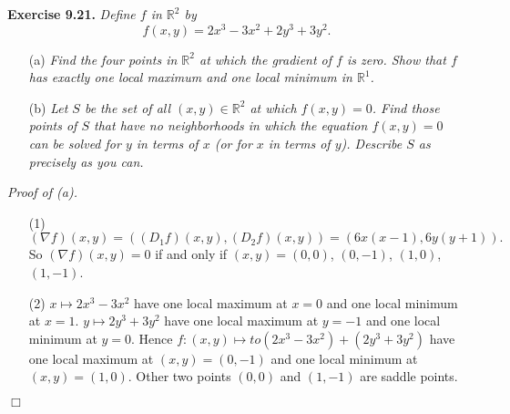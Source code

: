 \documentclass{article}
\begin{document}
\textbf{Exercise 9.21.}
\emph{Define $f$ in $\mathbb{R}^2$ by}
\[
  f(x,y) = 2x^3-3x^2+2y^3+3y^2.
\]
\begin{enumerate}
\item[(a)]
  \emph{Find the four points in $\mathbb{R}^2$ at which the gradient of $f$ is zero.
  Show that $f$ has exactly one local maximum and one local minimum in $\mathbb{R}^1$.}

\item[(b)]
  \emph{Let $S$ be the set of all $(x,y) \in \mathbb{R}^2$ at which $f(x,y) = 0$.
  Find those points of $S$ that have no neighborhoods in which the equation
  $f(x,y) = 0$ can be solved for $y$ in terms of $x$ (or for $x$ in terms of $y$).
  Describe $S$ as precisely as you can.} \\
\end{enumerate}



\emph{Proof of (a).}
\begin{enumerate}
\item[(1)]
  \[
    (\nabla f)(x,y)
    = ((D_1 f)(x,y), (D_2 f)(x,y))
    = (6x(x-1), 6y(y+1)).
  \]
  So $(\nabla f)(x,y) = 0$ if and only if
  $(x,y) = (0,0)$, $(0,-1)$, $(1,0)$, $(1,-1)$.

\item[(2)]
  $x \mapsto 2x^3 - 3x^2$
  have one local maximum at $x = 0$ and one local minimum at $x = 1$.
  $y \mapsto 2y^3 + 3y^2$
  have one local maximum at $y = -1$ and one local minimum at $y = 0$.
  Hence $f: (x,y) \mapsto to (2x^3 - 3x^2) + (2y^3 + 3y^2)$
  have one local maximum at $(x,y) = (0,-1)$ and
  one local minimum at $(x,y) = (1,0)$.
  Other two points $(0,0)$ and $(1,-1)$ are saddle points.
\end{enumerate}
$\Box$ \\
\end{document}
